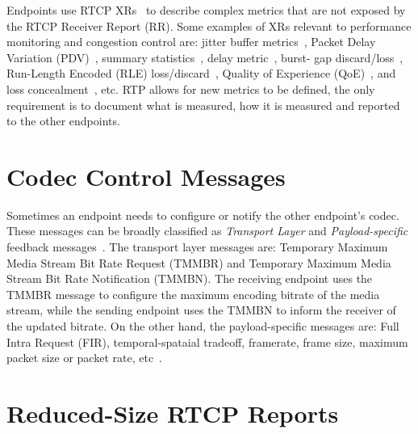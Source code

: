 Endpoints use RTCP XRs~\cite{rfc3611} to describe complex metrics that are not
exposed by the RTCP Receiver Report (RR). Some examples of XRs relevant to
performance monitoring and congestion control are: jitter buffer
metrics~\cite{draft.xr.jb}, Packet Delay Variation (PDV)~\cite{rfc6798},
summary statistics~\cite{draft.xr.stat}, delay metric~\cite{rfc6843}, burst-
gap discard/loss~\cite{draft.xr.bg.loss, draft.xr.bg.discard}, Run-Length
Encoded (RLE) loss/discard~\cite{draft.xr.discard.rle}, Quality of Experience
(QoE)~\cite{draft.xr.qoe}, and loss concealment~\cite{draft.xr.conceal}, etc.
RTP allows for new metrics to be defined, the only requirement is to document
what is measured, how it is measured and reported to the other endpoints.




\section{Codec Control Messages}

Sometimes an endpoint needs to configure or notify the other endpoint's codec.
These messages can be broadly classified as \emph{Transport Layer} and  \emph
{Payload-specific} feedback messages~\cite{rfc5104}. The transport layer
messages are: Temporary Maximum Media Stream Bit Rate Request (TMMBR) and
Temporary Maximum Media Stream Bit Rate Notification (TMMBN). The receiving
endpoint uses the TMMBR message to configure the maximum encoding bitrate of
the media stream, while the sending endpoint uses the TMMBN to inform the
receiver of the updated bitrate. On the other hand, the payload-specific
messages are: Full Intra Request (FIR), temporal-spataial tradeoff, framerate,
frame size, maximum packet size or packet rate, etc~\cite{draft.avt.cop}.

\section{Reduced-Size RTCP Reports}

